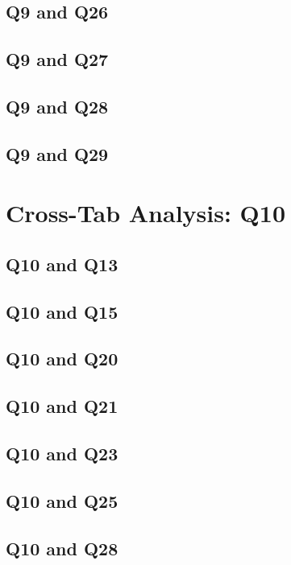 \documentclass{report}
\begin{document}
\section{Q9 and Q26}\clearpage
\section{Q9 and Q27}\clearpage
\section{Q9 and Q28}\clearpage
\section{Q9 and Q29}\clearpage

\chapter{Cross-Tab Analysis: Q10}

\section{Q10 and Q13}\clearpage
\section{Q10 and Q15}\clearpage
\section{Q10 and Q20}\clearpage
\section{Q10 and Q21}\clearpage
\section{Q10 and Q23}\clearpage
\section{Q10 and Q25}\clearpage
\section{Q10 and Q28}\clearpage
\end{document}
